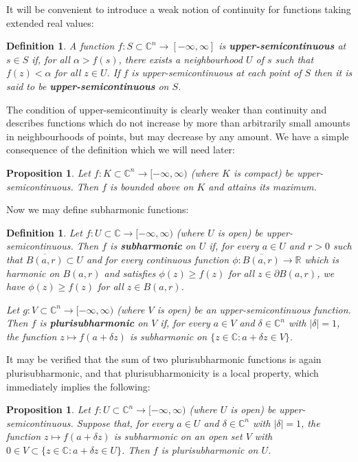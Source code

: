 \documentclass[11pt,a4paper, final, twoside]{article}
\newtheorem{definition}[theorem]{Definition}
\newtheorem{proposition}[theorem]{Proposition}
\numberwithin{equation}{section}
\newcommand{\C}{\mathbb C}
\newcommand{\R}{\mathbb R}
\newcommand{\clos}[1]{\overline{#1}}
\newcommand{\bd}{\partial}
\newcommand{\ball}{B}
\begin{document}
It will be convenient to introduce a weak notion of continuity for functions taking extended real values:
\begin{definition}
A function $f\colon S\subset\C^n\to [-\infty,\infty]$ is \textbf{upper-semicontinuous} at $s\in S$ if, for all $\alpha>f(s)$, there exists a neighbourhood $U$ of $s$ such that
$f(z)<\alpha$ for all $z\in U$. If $f$ is upper-semicontinuous at each point of $S$ then it is said to be \textbf{upper-semicontinuous} on $S$.
\end{definition}
The condition of upper-semicontinuity is clearly weaker than continuity and describes functions which do not increase by more than arbitrarily small amounts in neighbourhoods of points,
but may decrease by any amount. 
We have a simple consequence of the definition which we will need later:
\begin{proposition}
Let $f\colon K\subset\C^n\to [-\infty,\infty)$ (where $K$ is compact) be upper-semicontinuous. Then $f$ is bounded above on $K$ and attains its maximum. 
\end{proposition}
Now we may define subharmonic functions:
\begin{definition}
Let $f\colon U\subset \C\to [-\infty,\infty)$ (where $U$ is open) be upper-semicontinuous. Then $f$ is \textbf{subharmonic} on $U$ if, for every $a\in U$ and $r>0$ such that $\clos{\ball(a,r)}\subset U$
 and for every continuous function $\phi\colon \clos{\ball(a,r)}\to\R$
which is harmonic on $\ball(a,r)$ and satisfies $\phi(z)\geq f(z)$ for all $z\in\bd\ball(a,r)$, we have $\phi(z)\geq f(z)$ for all $z\in\ball(a,r)$.

Let $g\colon V\subset\C^n\to [-\infty,\infty)$ 
(where $V$ is open) be an upper-semicontinuous function. Then $f$ is \textbf{plurisubharmonic} on $V$ if, for every $a\in V$ and $\delta\in\C^n$ with $|\delta|=1$, the function
$z\mapsto f(a+\delta z)$ is subharmonic on $\{z\in\C\colon a+\delta z\in V\}$.
\end{definition}
It may be verified that the sum of two plurisubharmonic functions is again plurisubharmonic, and that plurisubharmonicity is a local property,
which immediately implies
the following:
\begin{proposition}
\label{pshlocal}
Let $f\colon U\subset\C^n\to [-\infty,\infty)$ 
(where $U$ is open) be upper-semicontinuous. Suppose that, for every $a\in U$ and $\delta\in\C^n$ with $|\delta|=1$, the function $z\mapsto f(a+\delta z)$ is subharmonic 
on an open set $V$ with $0\in V\subset \{z\in\C\colon a+\delta z\in U\}$. Then $f$ is plurisubharmonic on $U$.
\end{proposition}
\end{document}
